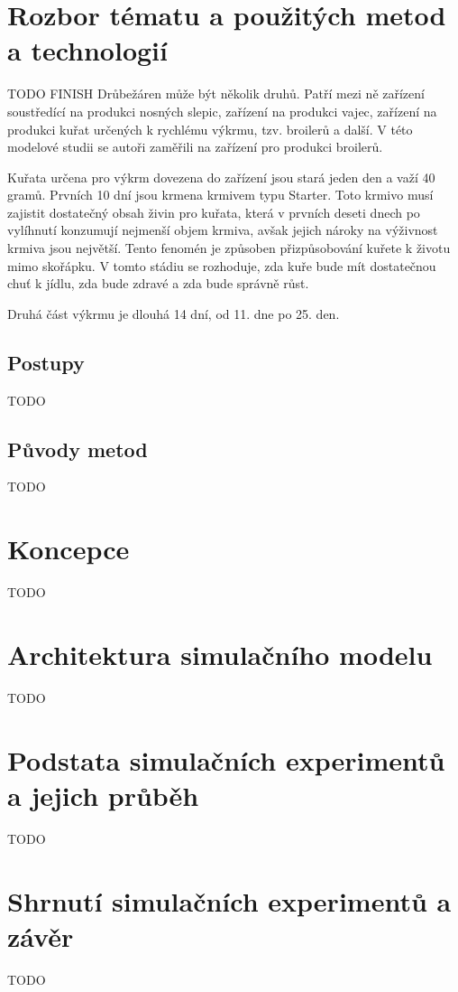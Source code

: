 \documentclass[a4paper,10pt]{article}
\begin{document}
%
%

\section{Rozbor tématu a použitých metod a technologií}
TODO FINISH\newline
Drůbežáren může být několik druhů. Patří mezi ně zařízení soustředící 
na produkci nosných slepic, zařízení na produkci vajec, zařízení 
na produkci kuřat určených k rychlému výkrmu, tzv. broilerů a další.
V této modelové studii se autoři zaměřili na zařízení pro produkci broilerů.
\par
Kuřata určena pro výkrm dovezena do zařízení jsou stará jeden den 
a važí 40 gramů. Prvních 10 dní jsou krmena krmivem typu Starter. Toto krmivo 
musí zajistit dostatečný obsah živin pro kuřata, která v prvních deseti dnech
po vylíhnutí konzumují nejmenší objem krmiva, avšak jejich nároky na výživnost krmiva
jsou největší. Tento fenomén je způsoben přizpůsobování kuřete k životu mimo skořápku.
V tomto stádiu se rozhoduje, zda kuře bude mít dostatečnou chuť k jídlu, zda bude zdravé
a zda bude správně růst.
\par
Druhá část výkrmu je dlouhá 14 dní, od 11. dne po 25. den. 


\subsection{Postupy}
TODO
\subsection{Původy metod}
TODO

\section{Koncepce}
TODO

\section{Architektura simulačního modelu}
TODO

\section{Podstata simulačních experimentů a jejich průběh}
TODO

\section{Shrnutí simulačních experimentů a závěr}
TODO




\renewcommand{\refname}{Zdroje}


\addcontentsline{toc}{section}{\refname}
\end{document}
